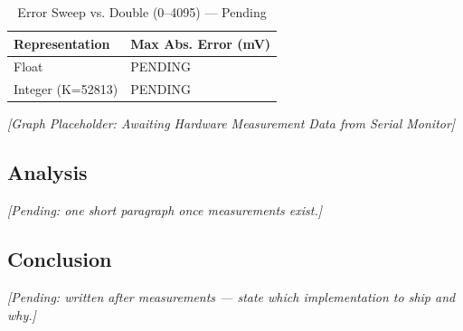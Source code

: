 \begin{table}[htbp]
\centering
\caption{Error Sweep vs. Double (0--4095) --- Pending}
\label{tab:final_error}
\small
\begin{tabularx}{\textwidth}{l X}
\toprule
\textbf{Representation} & \textbf{Max Abs. Error (mV)} \\
\midrule
Float & PENDING \\
Integer (K=52813) & PENDING \\
\bottomrule
\end{tabularx}
\end{table}

\textit{[Graph Placeholder: Awaiting Hardware Measurement Data from Serial Monitor]}

\subsection{Analysis}
\textit{[Pending: one short paragraph once measurements exist.]}

\subsection{Conclusion}
\textit{[Pending: written after measurements — state which implementation to ship and why.]}
